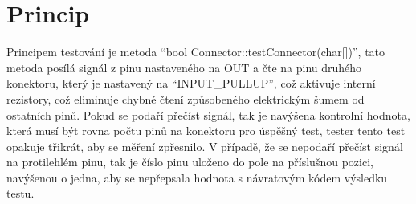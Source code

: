 
\section{Princip}
Principem testování je metoda “bool Connector::testConnector(char[])”, tato metoda posílá signál z pinu nastaveného na OUT a čte na pinu druhého konektoru, který je nastavený na “INPUT\_PULLUP”, což aktivuje interní rezistory, což eliminuje chybné čtení způsobeného elektrickým šumem od ostatních pinů. Pokud se podaří přečíst signál, tak je navýšena kontrolní hodnota, která musí být rovna počtu pinů na konektoru pro úspěšný test, tester tento test opakuje třikrát, aby se měření zpřesnilo. V případě, že se nepodaří přečíst signál na protilehlém pinu, tak je číslo pinu uloženo do pole na příslušnou pozici, navýšenou o jedna, aby se nepřepsala hodnota s návratovým kódem výsledku testu.